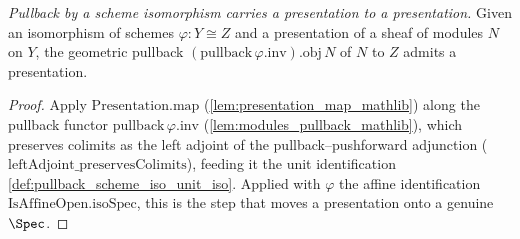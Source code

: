 \begin{definition}

  \label{def:presentation_pullback_of_scheme_iso}
  \textit{Pullback by a scheme isomorphism carries a presentation to a presentation.}
  Given an isomorphism of schemes \(\varphi : Y \cong Z\) and a presentation of a sheaf of modules
  \(N\) on \(Y\), the geometric pullback \((\mathrm{pullback}\,\varphi.\mathrm{inv}).\mathrm{obj}\,N\)
  of \(N\) to \(Z\) admits a presentation.
\end{definition}
\begin{proof}
  Apply \(\mathrm{Presentation.map}\) (\cref{lem:presentation_map_mathlib}) along the pullback functor
  \(\mathrm{pullback}\,\varphi.\mathrm{inv}\) (\cref{lem:modules_pullback_mathlib}), which preserves
  colimits as the left adjoint of the pullback--pushforward adjunction
  (\(\mathrm{leftAdjoint\_preservesColimits}\)), feeding it the unit identification
  \cref{def:pullback_scheme_iso_unit_iso}. Applied with \(\varphi\) the affine identification
  \(\mathrm{IsAffineOpen.isoSpec}\), this is the step that moves a presentation onto a genuine
  \(\Spec\).
\end{proof}

